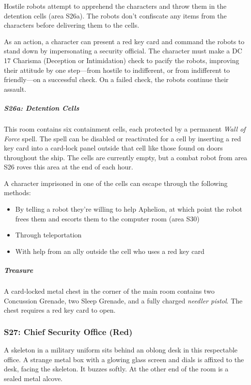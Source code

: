 \documentclass[10pt,a4paper,twoside,bg=print,twocolumn,openany,nodeprecatedcode]{dndbook}
\begin{document}
Hostile robots attempt to apprehend the characters and throw them in the detention cells (area S26a). The robots don't confiscate any items from the characters before delivering them to the cells.

As an action, a character can present a red key card and command the robots to stand down by impersonating a security official. The character must make a DC 17 Charisma (Deception or Intimidation) check to pacify the robots, improving their attitude by one step—from hostile to indifferent, or from indifferent to friendly—on a successful check. On a failed check, the robots continue their assault.

\subparagraph{S26a: Detention Cells}
This room contains six containment cells, each protected by a permanent \textit{Wall of Force} spell. The spell can be disabled or reactivated for a cell by inserting a red key card into a card-lock panel outside that cell like those found on doors throughout the ship. The cells are currently empty, but a combat robot from area S26 roves this area at the end of each hour.

A character imprisoned in one of the cells can escape through the following methods:


\begin{itemize}
\item By telling a robot they're willing to help Aphelion, at which point the robot frees them and escorts them to the computer room (area S30)
\item Through teleportation
\item With help from an ally outside the cell who uses a red key card
\end{itemize}

\subparagraph{Treasure}
A card-locked metal chest in the corner of the main room contains two Concussion Grenade, two Sleep Grenade, and a fully charged \textit{needler pistol}. The chest requires a red key card to open.

\subsubsection{S27: Chief Security Office (Red)}
\begin{DndReadAloud}{}
A skeleton in a military uniform sits behind an oblong desk in this respectable office. A strange metal box with a glowing glass screen and dials is affixed to the desk, facing the skeleton. It buzzes softly. At the other end of the room is a sealed metal alcove.

\end{DndReadAloud}
\end{document}
